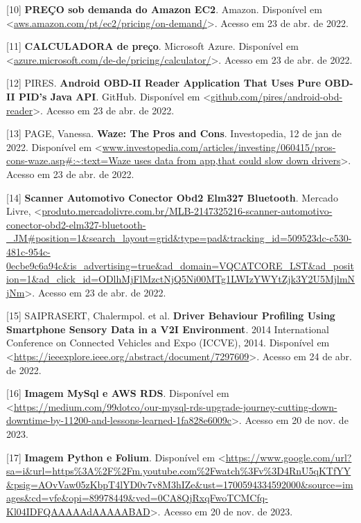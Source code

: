 [10] \textbf{PREÇO sob demanda do Amazon EC2}. Amazon. Disponível em <\url{aws.amazon.com/pt/ec2/pricing/on-demand/}>. Acesso em 23 de abr. de 2022.


[11] \textbf{CALCULADORA de preço}. Microsoft Azure. Disponível em <\url{azure.microsoft.com/de-de/pricing/calculator/}>. Acesso em 23 de abr. de 2022.

[12] PIRES. \textbf{Android OBD-II Reader Application That Uses Pure OBD-II PID's Java API}. GitHub. Disponível em <\url{github.com/pires/android-obd-reader}>. Acesso em 23 de abr. de 2022.

[13] PAGE, Vanessa. \textbf{Waze: The Pros and Cons}. Investopedia, 12 de jan de 2022. Disponível em <\url{www.investopedia.com/articles/investing/060415/pros-cons-waze.asp#:~:text=Waze uses data from app,that could slow down drivers}>. Acesso em 23 de abr. de 2022.


[14] \textbf{Scanner Automotivo Conector Obd2 Elm327 Bluetooth}. Mercado Livre, <\url{produto.mercadolivre.com.br/MLB-2147325216-scanner-automotivo-conector-obd2-elm327-bluetooth-_JM#position=1&search_layout=grid&type=pad&tracking_id=509523dc-c530-481c-954c-0ecbe9c6a94c&is_advertising=true&ad_domain=VQCATCORE_LST&ad_position=1&ad_click_id=ODlhMjFlMzctNjQ5Ni00MTg1LWIzYWYtZjk3Y2U5MjlmNjNm}>. Acesso em 23 de abr. de 2022.

[15] SAIPRASERT, Chalermpol. et al. \textbf{Driver Behaviour Profiling Using Smartphone Sensory Data in a V2I Environment}. 2014 International Conference on Connected Vehicles and Expo (ICCVE), 2014. Disponível em <\url{https://ieeexplore.ieee.org/abstract/document/7297609}>. Acesso em 24 de abr. de 2022.

[16] \textbf{Imagem MySql e AWS RDS}. Disponível em <\url{https://medium.com/99dotco/our-mysql-rds-upgrade-journey-cutting-down-downtime-by-11200-and-lessons-learned-1fa828e6009c}>. Acesso em 20 de nov. de 2023.

[17] \textbf{Imagem Python e Folium}. Disponível em <\url{https://www.google.com/url?sa=i&url=https%3A%2F%2Fm.youtube.com%2Fwatch%3Fv%3D4RnU5qKTfYY&psig=AOvVaw05zKbpT4lYD0v7v8M3hIZe&ust=1700594334592000&source=images&cd=vfe&opi=89978449&ved=0CA8QjRxqFwoTCMCfq-Kl04IDFQAAAAAdAAAAABAD}>. Acesso em 20 de nov. de 2023.
